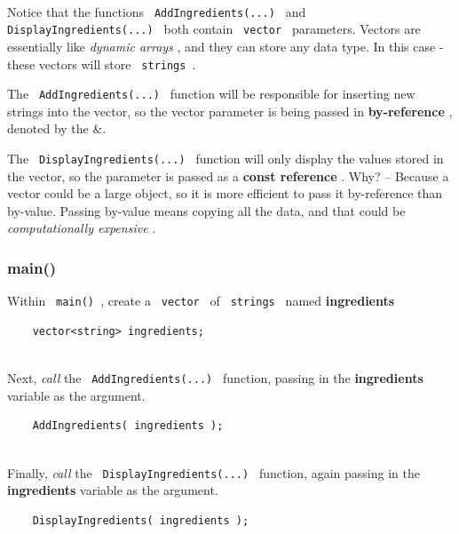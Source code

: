 \documentclass[a4paper,12pt]{book}
\begin{document}
                    ~\\
                    Notice that the functions \texttt{ AddIngredients(...) }
                    and \texttt{ DisplayIngredients(...) } both contain
                    \texttt{ vector } parameters. Vectors are essentially
                    like \textit{ dynamic arrays }, and they can store any
                    data type. In this case - these vectors will store
                    \texttt{ strings }.

                    The \texttt{ AddIngredients(...) } function will be responsible
                    for inserting new strings into the vector, so the
                    vector parameter is being passed in \textbf{ by-reference },
                    denoted by the \&.

                    The \texttt{ DisplayIngredients(...) } function will only
                    display the values stored in the vector, so the parameter
                    is passed as a \textbf{ const reference }. Why?
                    -- Because a vector could be a large object, so it is
                    more efficient to pass it by-reference than by-value.
                    Passing by-value means copying all the data, and that could
                    be \textit{ computationally expensive }.

                \hrulefill{}
                \subsubsection*{ main() }
    
                    Within \texttt{ main() }, create a
                    \texttt{ vector } of
                    \texttt{ strings } named
                    \textbf{ ingredients }

\begin{verbatim}
    vector<string> ingredients;
\end{verbatim}

                    ~\\ Next, \textit{ call } the \texttt{ AddIngredients(...) }
                    function, passing in the \textbf{ ingredients } variable
                    as the argument.
\begin{verbatim}
    AddIngredients( ingredients );
\end{verbatim}

                    ~\\ Finally, \textit{ call } the \texttt{ DisplayIngredients(...) }
                    function, again passing in the \textbf{ ingredients } variable
                    as the argument. 
\begin{verbatim}
    DisplayIngredients( ingredients );
\end{verbatim}
\end{document}
